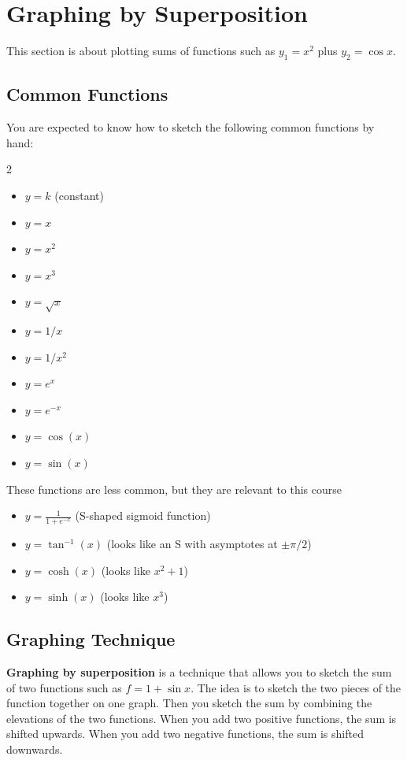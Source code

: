 \documentclass[09pt,letterpaper]{article}
\begin{document}

\section{Graphing by Superposition}
This section is about plotting sums of functions such as $y_1=x^2$ plus $y_2=\cos x$.

\subsection{Common Functions}
You are expected to know how to sketch the following common functions by hand:
\begin{multicols}{2}
\begin{itemize}
    \item $y=k$ (constant)
    \item $y=x$
    \item $y=x^2$
    \item $y=x^3$
    \item $y=\sqrt{x}$
    \item $y=1/x$
    \item $y=1/x^2$
    \item $y=e^x$
    \item $y=e^{-x}$
    \item $y=\cos(x)$
    \item $y=\sin(x)$
\end{itemize}
\end{multicols}

\noindent These functions are less common, but they are relevant to this course
\begin{itemize}
    \item $y=\frac{1}{1+e^{-x}}$ \quad  (S-shaped sigmoid function)
    \item $y=\tan^{-1}(x)$ \quad (looks like an S with asymptotes at $\pm\pi/2$)
    \item $y=\cosh (x)$ \quad (looks like $x^2+1$)
    \item $y=\sinh(x)$ \quad (looks like $x^3$)
\end{itemize}

\subsection{Graphing Technique}
\textbf{Graphing by superposition} is a technique that allows you to sketch the sum of two functions such as $f = 1 + \sin x$. The idea is to sketch the two pieces of the function together on one graph. Then you sketch the sum by combining the elevations of the two functions. When you add two positive functions, the sum is shifted upwards. When you add two negative functions, the sum is shifted downwards. 
\end{document}
